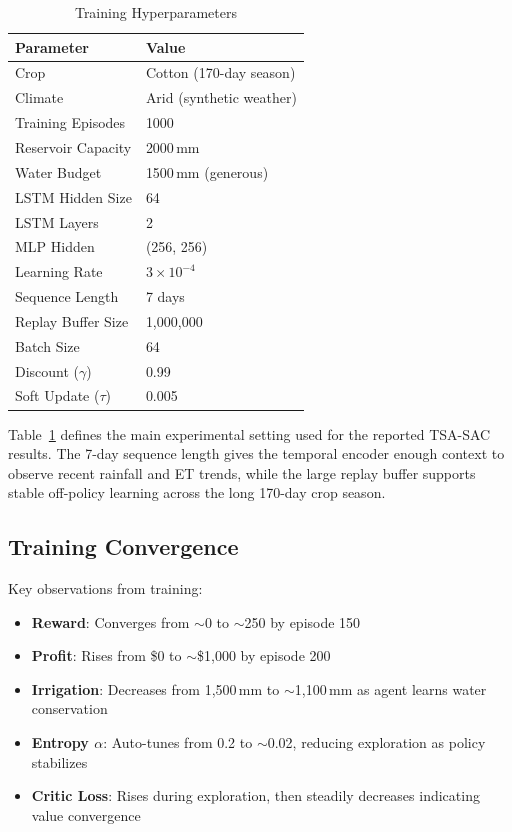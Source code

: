 \documentclass[12pt, a4paper]{article}
\begin{document}
\begin{table}[H]
\centering
\caption{Training Hyperparameters}
\label{tab:train}
\begin{tabular}{ll}
\toprule
\textbf{Parameter} & \textbf{Value} \\
\midrule
Crop & Cotton (170-day season) \\
Climate & Arid (synthetic weather) \\
Training Episodes & 1000 \\
Reservoir Capacity & 2000\,mm \\
Water Budget & 1500\,mm (generous) \\
LSTM Hidden Size & 64 \\
LSTM Layers & 2 \\
MLP Hidden & (256, 256) \\
Learning Rate & $3 \times 10^{-4}$ \\
Sequence Length & 7 days \\
Replay Buffer Size & 1,000,000 \\
Batch Size & 64 \\
Discount ($\gamma$) & 0.99 \\
Soft Update ($\tau$) & 0.005 \\
\bottomrule
\end{tabular}
\end{table}

Table~\ref{tab:train} defines the main experimental setting used for the reported TSA-SAC results. The 7-day sequence length gives the temporal encoder enough context to observe recent rainfall and ET trends, while the large replay buffer supports stable off-policy learning across the long 170-day crop season.

\subsection{Training Convergence}
Key observations from training:
\begin{itemize}
    \item \textbf{Reward}: Converges from $\sim$0 to $\sim$250 by episode 150
    \item \textbf{Profit}: Rises from \$0 to $\sim$\$1,000 by episode 200
    \item \textbf{Irrigation}: Decreases from 1,500\,mm to $\sim$1,100\,mm as agent learns water conservation
    \item \textbf{Entropy $\alpha$}: Auto-tunes from 0.2 to $\sim$0.02, reducing exploration as policy stabilizes
    \item \textbf{Critic Loss}: Rises during exploration, then steadily decreases indicating value convergence
\end{itemize}
\end{document}
